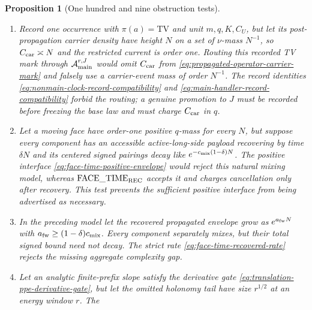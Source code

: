 \documentclass[11pt]{article}
\newtheorem{proposition}[theorem]{Proposition}
\begin{document}
\begin{proposition}[One hundred and nine obstruction tests]
\begin{enumerate}[label=\textup{(T\arabic*)}]
      $q_N=\delta_{a_N}$; similarly one may choose $q_r$ after the phase mode
      fixes $r$ and hence $N_{\rm PPE}(r)$.  All sectionwise masses and rate
      bounds can be uniform although no occurrence law was fixed before the
      linked tuple was known.  The datum-independent base law
      \eqref{eq:datum-independent-source-incidence-law} and the full linked
      consistency \eqref{eq:source-kernel-projective-consistency} reject
      both constructions; derived resolving coordinates select filters of
      one law and never select a new $q$.
\item Record one occurrence with $\pi(a)=\mathrm{TV}$ and unit
      $m,q,K,C_U$, but let its post-propagation carrier density have height
      $N$ on a set of $\nu$-mass $N^{-1}$, so $C_{\rm car}\asymp N$ and the
      restricted current is order one.  Routing this recorded TV mark through
      $\mathcal A_{\rm main}^{r,J}$ would omit $C_{\rm car}$ from
      \eqref{eq:propagated-operator-carrier-mark} and falsely use a
      carrier-event mass of order $N^{-1}$.  The record identities
      \eqref{eq:nonmain-clock-record-compatibility} and
      \eqref{eq:main-handler-record-compatibility} forbid the routing; a
      genuine promotion to $J$ must be recorded before freezing the base law
      and must charge $C_{\rm car}$ in $q$.
\item Let a moving face have order-one positive $q$-mass for every $N$, but
      suppose every component has an accessible active-long-side payload
      recovering by time $\delta N$ and its
      centered signed pairings decay like
      $e^{-c_{\rm mix}(1-\delta)N}$.  The positive interface
      \eqref{eq:face-time-positive-envelope} would reject this natural
      mixing model, whereas $\mathrm{FACE\_TIME}_{\rm REC}$ accepts it and
      charges cancellation only after recovery.  This test prevents the
      sufficient positive interface from being advertised as necessary.
\item In the preceding model let the recovered propagated envelope grow as
      $e^{a_{\rm fw}N}$ with
      $a_{\rm fw}\ge(1-\delta)c_{\rm mix}$.  Every component separately
      mixes, but their total signed bound need not decay.  The strict rate
      \eqref{eq:face-time-recovered-rate} rejects the missing aggregate
      complexity gap.
\item Let an analytic finite-prefix slope satisfy the derivative gate
      \eqref{eq:translation-ppe-derivative-gate}, but let the omitted
      holonomy tail have size $r^{1/2}$ at an energy window $r$.  The

\end{enumerate}
\end{proposition}
\end{document}
